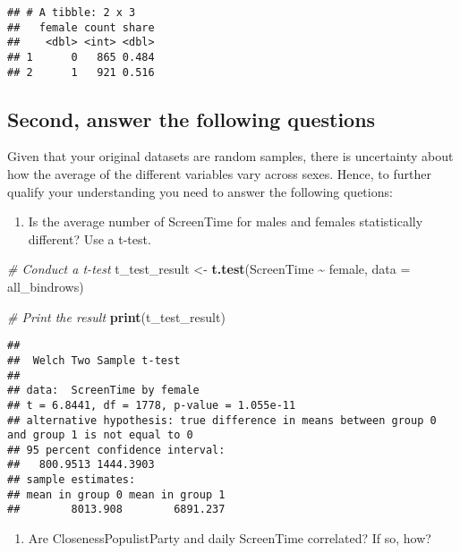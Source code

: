 \documentclass[
]{book}
\newenvironment{Shaded}{\begin{snugshade}}{\end{snugshade}}
\newcommand{\AttributeTok}[1]{\textcolor[rgb]{0.13,0.29,0.53}{#1}}
\newcommand{\CommentTok}[1]{\textcolor[rgb]{0.56,0.35,0.01}{\textit{#1}}}
\newcommand{\FunctionTok}[1]{\textcolor[rgb]{0.13,0.29,0.53}{\textbf{#1}}}
\newcommand{\NormalTok}[1]{#1}
\newcommand{\OtherTok}[1]{\textcolor[rgb]{0.56,0.35,0.01}{#1}}
\newcommand{\SpecialCharTok}[1]{\textcolor[rgb]{0.81,0.36,0.00}{\textbf{#1}}}
\providecommand{\tightlist}{%
  \setlength{\itemsep}{0pt}\setlength{\parskip}{0pt}}
\begin{document}
\begin{verbatim}
## # A tibble: 2 x 3
##   female count share
##    <dbl> <int> <dbl>
## 1      0   865 0.484
## 2      1   921 0.516
\end{verbatim}

\hypertarget{second-answer-the-following-questions}{%
\subsection{Second, answer the following questions}\label{second-answer-the-following-questions}}

Given that your original datasets are random samples, there is uncertainty about how the average of the different variables vary across sexes. Hence, to further qualify your understanding you need to answer the following quetions:

\begin{enumerate}
\def\labelenumi{\arabic{enumi}.}
\tightlist
\item
  Is the average number of ScreenTime for males and females statistically different? Use a t-test.
\end{enumerate}

\begin{Shaded}
\begin{Highlighting}[]
\CommentTok{\# Conduct a t{-}test}
\NormalTok{t\_test\_result }\OtherTok{\textless{}{-}} \FunctionTok{t.test}\NormalTok{(ScreenTime }\SpecialCharTok{\textasciitilde{}}\NormalTok{ female, }\AttributeTok{data =}\NormalTok{ all\_bindrows)}

\CommentTok{\# Print the result}
\FunctionTok{print}\NormalTok{(t\_test\_result)}
\end{Highlighting}
\end{Shaded}

\begin{verbatim}
## 
##  Welch Two Sample t-test
## 
## data:  ScreenTime by female
## t = 6.8441, df = 1778, p-value = 1.055e-11
## alternative hypothesis: true difference in means between group 0 and group 1 is not equal to 0
## 95 percent confidence interval:
##   800.9513 1444.3903
## sample estimates:
## mean in group 0 mean in group 1 
##        8013.908        6891.237
\end{verbatim}

\begin{enumerate}
\def\labelenumi{\arabic{enumi}.}
\setcounter{enumi}{1}
\tightlist
\item
  Are ClosenessPopulistParty and daily ScreenTime correlated? If so, how?
\end{enumerate}
\end{document}
